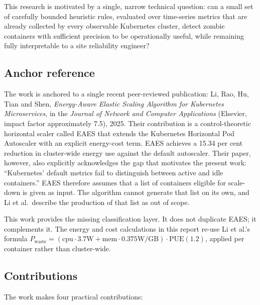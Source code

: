 \documentclass[11pt,a4paper,oneside]{article}
\begin{document}
This research is motivated by a single, narrow technical question: can a
small set of carefully bounded heuristic rules, evaluated over time-series
metrics that are already collected by every observable Kubernetes cluster,
detect zombie containers with sufficient precision to be operationally
useful, while remaining fully interpretable to a site reliability engineer?

\subsection{Anchor reference}
\label{sec:anchor}

The work is anchored to a single recent peer-reviewed publication:
Li, Rao, Hu, Tian and Shen, \emph{Energy-Aware Elastic Scaling Algorithm for
Kubernetes Microservices}, in the \emph{Journal of Network and Computer
Applications} (Elsevier, impact factor approximately 7.5), 2025. Their
contribution is a control-theoretic horizontal scaler called EAES that
extends the Kubernetes Horizontal Pod Autoscaler with an explicit
energy-cost term. EAES achieves a 15.34 per cent reduction in cluster-wide
energy use against the default autoscaler. Their paper, however, also
explicitly acknowledges the gap that motivates the present work:
``Kubernetes' default metrics fail to distinguish between active and idle
containers.'' EAES therefore assumes that a list of containers eligible for
scale-down is given as input. The algorithm cannot generate that list on
its own, and Li et al.\ describe the production of that list as out of
scope.

This work provides the missing classification layer. It does not duplicate
EAES; it complements it. The energy and cost calculations in this report
re-use Li et al.'s formula
\(P_{\text{waste}} = (\text{cpu}\cdot 3.7\text{W} +
\text{mem}\cdot 0.375\text{W/GB}) \cdot \text{PUE}(1.2)\),
applied per container rather than cluster-wide.

\subsection{Contributions}

The work makes four practical contributions:
\end{document}
